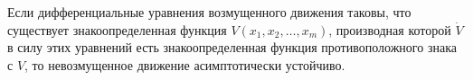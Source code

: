 \begin{to_thr}
    Если дифференциальные уравнения возмущенного движения таковы, что существует знакоопределенная функция $V(x_1, x_2, \ldots, x_m)$, производная которой $\dot{V}$ в силу этих уравнений есть знакоопределенная функция противоположного знака с $V$, то невозмущенное движение асимптотически устойчиво.
\end{to_thr}


